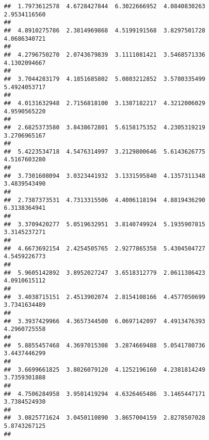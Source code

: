 \documentclass[]{article}
\begin{document}
\begin{verbatim}
##  1.7973612578  4.6728427844  6.3022666952  4.0840830263  2.9534116560 
##                                                                       
##  4.8910275786  2.3814969868  4.5199191568  3.8297501728  4.0686340721 
##                                                                       
##  4.2796750270  2.0743679839  3.1111081421  3.5468571336  4.1302094667 
##                                                                       
##  3.7044283179  4.1851685802  5.0803212852  3.5780335499  5.4924053717 
##                                                                       
##  4.0131632948  2.7156818100  3.1387182217  4.3212006029  4.9590565220 
##                                                                       
##  2.6825373580  3.8438672801  5.6158175352  4.2305319219  3.2706965167 
##                                                                       
##  5.4223534718  4.5476314997  3.2129800646  5.6143626775  4.5167603280 
##                                                                       
##  3.7301608094  3.0323441932  3.1331595840  4.1357311348  3.4839543490 
##                                                                       
##  2.7387373531  4.7313315506  4.4006118194  4.8819436290  6.3138364941 
##                                                                       
##  3.3709420277  5.0519632951  3.8140749924  5.1935907815  3.3145237271 
##                                                                       
##  4.6673692154  2.4254505765  2.9277865358  5.4304504727  4.5459226773 
##                                                                       
##  5.9605142892  3.8952027247  3.6518312779  2.0611386423  4.0910615112 
##                                                                       
##  3.4038715151  2.4513902074  2.8154108166  4.4577050699  3.7341634489 
##                                                                       
##  3.3937429966  4.3657344500  6.0697142097  4.4913476393  4.2960725558 
##                                                                       
##  5.8855457468  4.3697015308  3.2874669488  5.0541780736  3.4437446299 
##                                                                       
##  3.6699661825  3.8026079120  4.1252196160  4.2381814249  3.7359301888 
##                                                                       
##  4.7506284958  3.9501419294  4.6326465486  3.1465447171  3.7384524930 
##                                                                       
##  3.0825771624  3.0450110890  3.8657004159  2.8278507028  5.8743267125 
##                                                                       

\end{verbatim}
\end{document}
